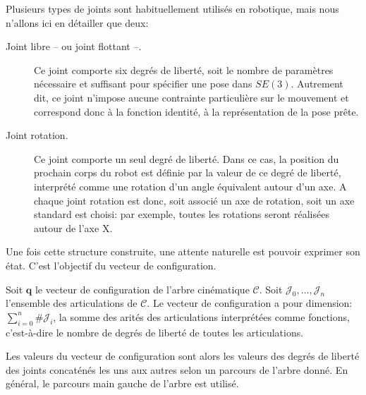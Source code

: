 Plusieurs types de joints sont habituellement utilisés en robotique,
mais nous n'allons ici en détailler que deux:
\begin{description}
\item[Joint libre -- ou joint flottant --.] Ce joint
  comporte six degrés de liberté, soit le nombre de paramètres
  nécessaire et suffisant pour spécifier une pose dans
  $SE(3)$. Autrement dit, ce joint n'impose aucune contrainte
  particulière sur le mouvement et correspond donc à la fonction
  identité, à la représentation de la pose prête.
\item[Joint rotation.] Ce joint comporte un seul
  degré de liberté. Dans ce cas, la position du prochain corps du
  robot est définie par la valeur de ce degré de liberté, interprété
  comme une rotation d'un angle équivalent autour d'un axe. A chaque
  joint rotation est donc, soit associé un axe de rotation, soit un axe
  standard est choisi: par exemple, toutes les rotations seront
  réalisées autour de l'axe X.
\end{description}


Une fois cette structure construite, une attente naturelle est pouvoir
exprimer son état. C'est l'objectif du vecteur de
configuration.

\begin{mydef}
  Soit $\mathbf{q}$ le vecteur de configuration de l'arbre cinématique
  $\mathcal{C}$. Soit $\mathcal{J}_0, \dotsc, \mathcal{J}_n$
  l'ensemble des articulations de $\mathcal{C}$. Le vecteur de
  configuration a pour dimension: $\sum_{i=0}^n \#\mathcal{J}_i$, la
  somme des arités des articulations interprétées comme fonctions,
  c'est-à-dire le nombre de degrés de liberté de toutes les
  articulations.


  Les valeurs du vecteur de configuration sont alors les valeurs des
  degrés de liberté des joints concaténés les uns aux autres selon un
  parcours de l'arbre donné. En général, le parcours main gauche de
  l'arbre est utilisé.
\end{mydef}

